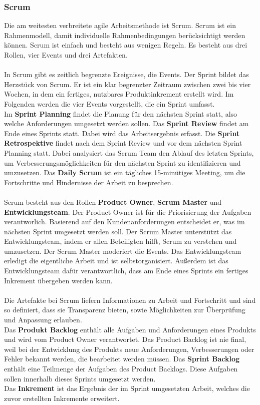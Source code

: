 \documentclass[ngerman]{seminarvorlage}
\begin{document}
\subsubsection{Scrum}
Die am weitesten verbreitete agile Arbeitsmethode ist Scrum. Scrum ist ein Rahmenmodell, damit individuelle Rahmenbedingungen berücksichtigt werden können. Scrum ist einfach und besteht aus wenigen Regeln. Es besteht aus drei Rollen, vier Events und drei Artefakten.\cite{Gaida.2021, Simschek.2022}\\\\
In Scrum gibt es zeitlich begrenzte Ereignisse, die Events. Der Sprint bildet das Herzstück von Scrum. Er ist ein klar begrenzter Zeitraum zwischen zwei bis vier Wochen, in dem ein fertiges, nutzbares Produktinkrement erstellt wird. Im Folgenden werden die vier Events vorgestellt, die ein Sprint umfasst.\\ Im \textbf{Sprint Planning} findet die Planung für den nächsten Sprint statt, also welche Anforderungen umgesetzt werden sollen. Das \textbf{Sprint Review} findet am Ende eines Sprints statt. Dabei wird das Arbeitsergebnis erfasst. Die \textbf{Sprint Retrospektive} findet nach dem Sprint Review und vor dem nächsten Sprint Planning statt. Dabei analysiert das Scrum Team den Ablauf des letzten Sprints, um Verbesserungsmöglichkeiten für den nächsten Sprint zu identifizieren und umzusetzen. Das \textbf{Daily Scrum} ist ein tägliches 15-minütiges Meeting, um die Fortschritte und Hindernisse der Arbeit zu besprechen.\\\\
Scrum besteht aus den Rollen \textbf{Product Owner}, \textbf{Scrum Master} und \textbf{Entwicklungsteam}. Der Product Owner ist für die Priorisierung der Aufgaben verantworlich. Basierend auf den Kundenanforderungen entscheidet er, was im nächsten Sprint umgesetzt werden soll. Der Scrum Master unterstützt das Entwicklungsteam, indem er allen Beteiligten hilft, Scrum zu verstehen und umzusetzen. Der Scrum Master moderiert die Events. Das Entwicklungsteam erledigt die eigentliche Arbeit und ist selbstorganisiert. Außerdem ist das Entwicklungsteam dafür verantwortlich, dass am Ende eines Sprints ein fertiges Inkrement übergeben werden kann.\cite{Mucke.2024}\\\\
Die Artefakte bei Scrum liefern Informationen zu Arbeit und Fortschritt und sind so definiert, dass sie Transparenz bieten, sowie Möglichkeiten zur Überprüfung und Anpassung erlauben.\\ Das \textbf{Produkt Backlog} enthält alle Aufgaben und Anforderungen eines Produkts und wird vom Product Owner verantwortet. Das Product Backlog ist nie final, weil bei der Entwicklung des Produkts neue Anforderungen, Verbesserungen oder Fehler bekannt werden, die bearbeitet werden müssen. Das \textbf{Sprint Backlog} enthält eine Teilmenge der Aufgaben des Product Backlogs. Diese Aufgaben sollen innerhalb dieses Sprints umgesetzt werden.\\ Das \textbf{Inkrement} ist das Ergebnis der im Sprint umgesetzten Arbeit, welches die zuvor erstellten Inkremente erweitert.\\\\
\end{document}
